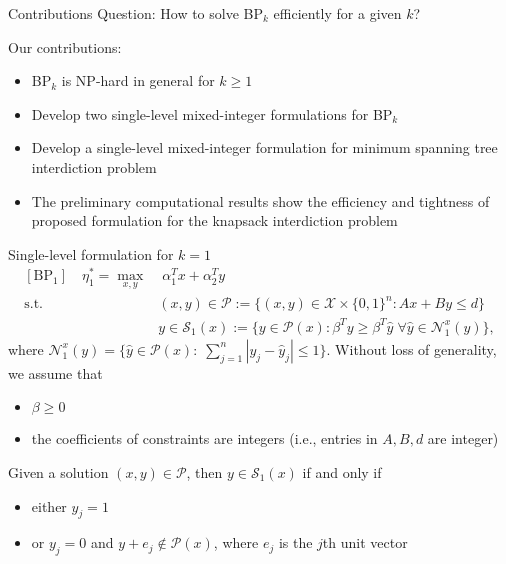 \documentclass{beamer}
\begin{document}
\begin{frame}{Contributions} \small
Question: How to solve BP$_k$ efficiently for a given $k$?

\vspace{0.5cm}
Our contributions:
\begin{itemize}
	\item BP$_k$ is NP-hard in general for $k \geq 1$
	\item Develop two single-level mixed-integer formulations for BP$_k$
	\item Develop a single-level mixed-integer formulation for minimum spanning tree interdiction problem
	\item The preliminary computational results show the efficiency and tightness of proposed formulation for the knapsack interdiction problem
\end{itemize}

\end{frame}

\begin{frame}{Single-level formulation for $k=1$} \small
	\begin{align*}
	[\text{BP}_1]\quad   \eta_1^* = \max_{x, y}& \; \alpha_1^Tx + \alpha_2^T y \\
	\text{s.t.~} & (x, y)\in \mathcal{P}:=\{(x, y)\in \mathcal{X} \times \{0,1\}^n: Ax + By\leq d \}\\
	& y \in \mathcal{S}_1(x) := \{y \in \mathcal{P}(x): \beta^T y \geq \beta^T \hat{y}\; \forall \hat{y} \in \mathcal{N}_1^x(y)\},
	\end{align*}
	where $\mathcal{N}_1^x(y) = \{\hat{y} \in \mathcal{P}(x):\; \sum_{j=1}^n |y_j - \hat{y}_j| \leq 1 \}$. Without loss of generality, we assume that 
	\begin{itemize}
		\item $\beta \geq 0$
		\item the coefficients of constraints are integers (i.e., entries in $A, B, d$ are integer)
	\end{itemize}
	\pause
	
	\begin{lemma}
		Given a solution $(x, y) \in \mathcal{P}$, then $y \in \mathcal{S}_1(x)$ if and only if
		\begin{itemize}
			\item either $y_j =1$ 
			\item or $y_j = 0$ and $y+ e_j \notin \mathcal{P}(x)$, where $e_j$ is the $j$th unit vector
		\end{itemize}
	\end{lemma}
\end{frame}
\end{document}
